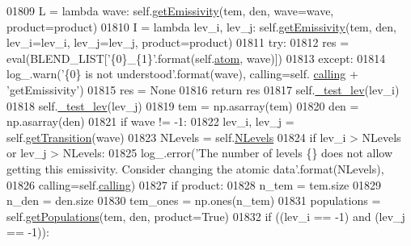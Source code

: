 \begin{DoxyCode}
01809             L = \textcolor{keyword}{lambda} wave: self.\hyperlink{classpyneb_1_1core_1_1pynebcore_1_1_atom_aaf4e84a9d5f835e6284bd9302314f775}{getEmissivity}(tem, den, wave=wave, product=product)
01810             I = \textcolor{keyword}{lambda} lev\_i, lev\_j: self.\hyperlink{classpyneb_1_1core_1_1pynebcore_1_1_atom_aaf4e84a9d5f835e6284bd9302314f775}{getEmissivity}(tem, den, lev\_i=lev\_i, lev\_j=lev\_j, 
      product=product)
01811             \textcolor{keywordflow}{try}:
01812                 res = eval(BLEND\_LIST[\textcolor{stringliteral}{'\{0\}\_\{1\}'}.format(self.\hyperlink{classpyneb_1_1core_1_1pynebcore_1_1_atom_a192f3e20446d7fba81d789bc705d6c71}{atom}, wave)])
01813             \textcolor{keywordflow}{except}:
01814                 log\_.warn(\textcolor{stringliteral}{'\{0\} is not understood'}.format(wave), calling=self.
      \hyperlink{classpyneb_1_1core_1_1pynebcore_1_1_atom_a373b7735acf4f528b54bddf373ad67a1}{calling} + \textcolor{stringliteral}{'getEmissivity'})
01815                 res = \textcolor{keywordtype}{None}
01816             \textcolor{keywordflow}{return} res
01817         self.\hyperlink{classpyneb_1_1core_1_1pynebcore_1_1_atom_afa4b9737dcd5bed31e25e8f0b6dc4730}{\_test\_lev}(lev\_i)
01818         self.\hyperlink{classpyneb_1_1core_1_1pynebcore_1_1_atom_afa4b9737dcd5bed31e25e8f0b6dc4730}{\_test\_lev}(lev\_j)
01819         tem = np.asarray(tem)
01820         den = np.asarray(den)
01821         \textcolor{keywordflow}{if} wave != -1:
01822             lev\_i, lev\_j = self.\hyperlink{classpyneb_1_1core_1_1pynebcore_1_1_atom_a7c9f17a3d9e841267add92377d9d1ede}{getTransition}(wave)
01823         NLevels = self.\hyperlink{classpyneb_1_1core_1_1pynebcore_1_1_atom_a6b43c1e6431a6786c1b4267f704fb4e8}{NLevels}
01824         \textcolor{keywordflow}{if} lev\_i > NLevels \textcolor{keywordflow}{or} lev\_j > NLevels:
01825             log\_.error(\textcolor{stringliteral}{'The number of levels \{\} does not allow getting this emissivity. Consider changing
       the atomic data'}.format(NLevels),
01826                           calling=self.\hyperlink{classpyneb_1_1core_1_1pynebcore_1_1_atom_a373b7735acf4f528b54bddf373ad67a1}{calling}) 
01827         \textcolor{keywordflow}{if} product:
01828             n\_tem = tem.size
01829             n\_den = den.size
01830             tem\_ones = np.ones(n\_tem)
01831             populations = self.\hyperlink{classpyneb_1_1core_1_1pynebcore_1_1_atom_aab7496403c8aaef40ab3b20b5c00e9f0}{getPopulations}(tem, den, product=\textcolor{keyword}{True})
01832             \textcolor{keywordflow}{if} ((lev\_i == -1) \textcolor{keywordflow}{and} (lev\_j == -1)):

\end{DoxyCode}
